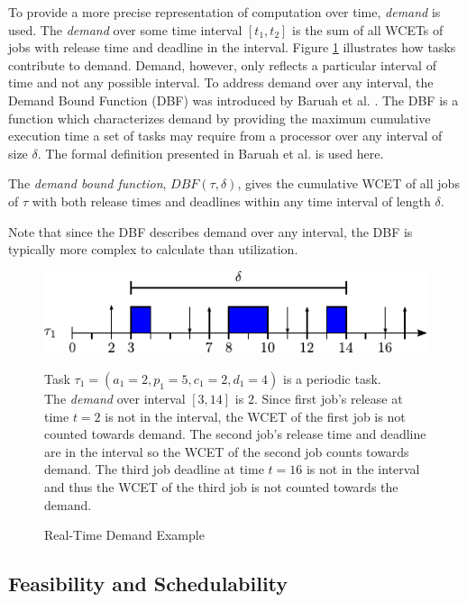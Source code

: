 To provide a more precise representation of computation over time, \textit{demand} is used.
The \textit{demand} over some time interval $[t_1,t_2]$ is the sum of all WCETs of jobs with release time and deadline in the interval.
Figure \ref{fig:rt-demand} illustrates how tasks contribute to demand.
Demand, however, only reflects a particular interval of time and not any possible interval.
To address demand over any interval, the Demand Bound Function (DBF) was introduced by Baruah et al. \cite{baruah_preemptively_1990}.
The DBF is a function which characterizes demand by providing the maximum cumulative execution time a set of tasks may require from a processor over any interval of size $\delta$. 
The formal definition presented in Baruah et al. \cite{baruah_preemptively_1990} is used here.
\begin{definition}\label{def:dbf}
    The \textit{demand bound function}, $DBF(\tau,\delta)$, gives the cumulative WCET of all jobs of $\tau$ with both release times and deadlines within any time interval of length $\delta$.
\end{definition}
Note that since the DBF describes demand over any interval, the DBF is typically more complex to calculate than utilization.

\begin{figure}[!htbp]
    \centering
    \includegraphics[width=0.75\linewidth]{fig/demandExample.pdf}
    \caption{Real-Time Demand Example}
    Task $\tau_1 = (a_1=2, p_1 = 5, c_1=2, d_1=4)$ is a periodic task.\\
    The \textit{demand} over interval $[3,14]$ is $2$.
    Since first job's release at time $t=2$ is not in the interval, the WCET of the first job is not counted towards demand.
    The second job's release time and deadline are in the interval so the WCET of the second job counts towards demand.
    The third job deadline at time $t=16$ is not in the interval and thus the WCET of the third job is not counted towards the demand.
    \label{fig:rt-demand}
\end{figure}

\subsection{Feasibility and Schedulability}

